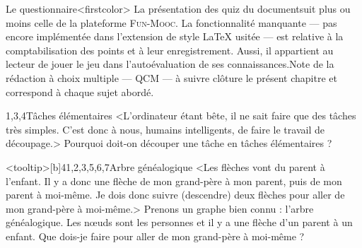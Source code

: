 Le questionnaire\caution[t]<firstcolor>{%
La présentation des quiz du document\linebreak suit plus ou moins celle de la platefor\-me \textsc{Fun-Mooc}. La fonctionnalité manquante --- pas encore implémentée dans l'extension de style \LaTeX{} usitée --- est relative à la comptabilisation des points et à leur enregistrement. Aussi, il appartient au lecteur de jouer le jeu dans l'auto\-évaluation de ses connaissances.}{Note de la rédaction}
à choix multiple%
--- QCM --- à suivre clôture le présent chapitre  et correspond à chaque sujet abordé.
\parnotes

\vspace{6pt}

\begin{quiz}[title={Décomposition en tâches}]
\vspace{-\baselineskip}
\begin{quizquestion*}[b]{2}{1,3,4}{Tâches élémentaires}
<L'ordinateur étant bête, il ne sait faire que des tâches très simples. C'est donc à nous, humains intelligents, de faire le travail de découpage.>
Pourquoi doit-on découper une tâche en tâches élémentaires ?
\end{quizquestion*}

\vfill\pagebreak

\begin{quizquestion*}<tooltip>[b]{4}{1,2,3,5,6,7}{Arbre généalogique}
<Les flèches vont du parent à l'enfant. Il y a donc une flèche de mon grand-père à mon parent, puis de mon parent à moi-même. Je dois donc suivre (descendre) deux flèches pour aller de mon grand-père à moi-même.>
Prenons un graphe bien connu : l'arbre généalogique. Les nœuds sont les personnes et il y a une flèche d'un parent à un enfant. Que dois-je faire pour aller de mon grand-père à moi-même ?
\end{quizquestion*}
\end{quiz}


